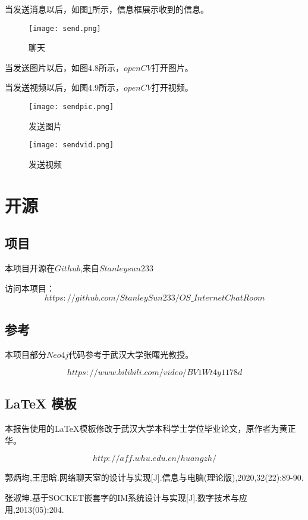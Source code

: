 \documentclass[forprint]{OSPaper}
\begin{document}
当发送消息以后，如图\ref{fig:19}所示，信息框展示收到的信息。

\begin{figure}[ht]
	\centering
	\texttt{[image: send.png]}
	\caption{聊天}
	\label{fig:19}
\end{figure}
\vspace*{2.5cm}
当发送图片以后，如图4.8所示，$openCV$打开图片。

当发送视频以后，如图4.9所示，$openCV$打开视频。

\begin{figure}[h]
	\begin{minipage}[t]{0.5\linewidth}
		\centering
		\label{fig:20}
		\texttt{[image: sendpic.png]}
		\caption{发送图片}
	\end{minipage}%
	\begin{minipage}[t]{0.5\linewidth}
		\centering
		\label{fig:21}
		\texttt{[image: sendvid.png]}
		\caption{发送视频}
	\end{minipage}%
\end{figure}

\chapter{开源}
\section{项目}
本项目开源在$Github$,来自$Stanleysun233$

访问本项目：
\begin{equation}
	https://github.com/StanleySun233/OS\_InternetChatRoom
\end{equation}
\section{参考}
本项目部分$Neo4j$代码参考于武汉大学张曙光教授。

\begin{equation}
	https://www.bilibili.com/video/BV1Wt4y1178d
\end{equation}

\section{\LaTeX{} 模板}
本报告使用的\LaTeX{}模板修改于武汉大学本科学士学位毕业论文，原作者为黄正华。

\begin{equation}
	http://aff.whu.edu.cn/huangzh/
\end{equation}
\cleardoublepage{}
{}
\begin{thebibliography}{99}

   郭炳均,王思晗.网络聊天室的设计与实现[J].信息与电脑(理论版),2020,32(22):89-90.

   张淑坤.基于SOCKET嵌套字的IM系统设计与实现[J].数字技术与应用,2013(05):204.

\end{thebibliography}
\end{document}
